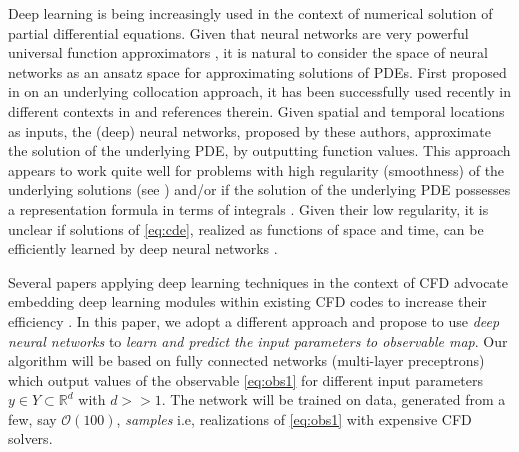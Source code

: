 \documentclass[a4paper]{article}
\numberwithin{equation}{section}
\numberwithin{equation}{section}
\theoremstyle{definition}
\theoremstyle{myremarkstyle}
\newcommand{\R}{\mathbb{R}}
\begin{document}
Deep learning is being increasingly used in the context of numerical solution of partial differential equations. Given that neural networks are very powerful universal function approximators \cite{Cy1,Kor1,Bar1,MP1,YAR1}, it is natural to consider the space of neural networks as an ansatz space for approximating solutions of PDEs. First proposed in \cite{Lag1} on an underlying collocation approach, it has been successfully used recently in different contexts in \cite{Kar1,Kar2,JR1,E1,E2,E3} and references therein. Given spatial and temporal locations as inputs, the (deep) neural networks, proposed by these authors, approximate the solution of the underlying PDE, by outputting function values. This approach appears to work quite well for problems with high regularity (smoothness) of the underlying solutions (see \cite{SZ1,E3}) and/or if the solution of the underlying PDE possesses a representation formula in terms of integrals \cite{E2,E3}.  Given their low regularity, it is unclear if solutions of \eqref{eq:cde}, realized as functions of space and time, can be efficiently learned by deep neural networks \cite{INC}.

Several papers applying deep learning techniques in the context of CFD advocate embedding deep learning modules within existing CFD codes to increase their efficiency \cite{INC,DR1,DL_SM1}. In this paper,  we adopt a different approach and propose to use \emph{deep neural networks} to \emph{learn and predict the input parameters to observable map}. Our algorithm will be based on fully connected networks (multi-layer preceptrons) which output values of the observable \eqref{eq:obs1} for different input parameters $y \in Y \subset \R^{d}$ with $d >>1$. The network will be trained on data, generated from a few, say ${\mathcal  O}(100)$, \emph{samples} i.e, realizations of \eqref{eq:obs1} with expensive CFD solvers.
\end{document}
